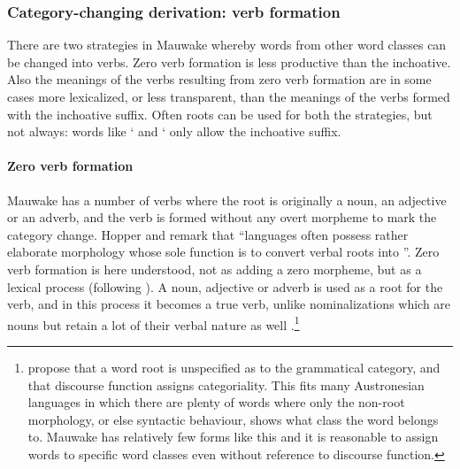 \subsubsection[Category-changing derivation: verb formation]{Category-changing derivation: verb formation}
{}
There are two strategies in Mauwake whereby words from other word classes can be changed into verbs. Zero verb formation is less productive than the inchoative. Also the meanings of the verbs resulting from zero verb formation are in some cases more lexicalized, or less transparent, than the meanings of the verbs formed with the inchoative suffix. Often roots can be used for both the strategies, but not always: words like  ` and  ` only allow the inchoative suffix.

\paragraph[Zero verb formation]{Zero verb formation}
{}
Mauwake has a number of verbs where the root is originally a noun, an adjective or an adverb, and the verb is formed without any overt morpheme to mark the category change. Hopper and \citet[745]{Thompson1984} remark that ``{languages often possess rather elaborate morphology whose sole function is to convert verbal roots into}  ''. Zero verb formation is here understood, not as adding a zero morpheme, but as a lexical process (following \citealt[224]{Payne1997}). A noun, adjective or adverb is used as a root for the verb, and in this process it becomes a true verb, unlike nominalizations which are nouns but retain a lot of their verbal nature as well \citep[747]{HopperEtAl1984}%
.\footnote{\citet{HopperEtAl1984} propose that a word root is unspecified as to the grammatical category, and that discourse function assigns categoriality. This fits many Austronesian languages in which there are plenty of words where only the non-root morphology, or else syntactic behaviour, shows what class the word belongs to. Mauwake has relatively few forms like this and it is reasonable to assign words to specific word classes even without reference to discourse function.}

